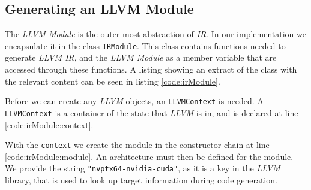 \subsection{Generating an LLVM Module} \label{sec:irmodule}
The \textit{LLVM Module} is the outer most abstraction of \textit{IR}. In our implementation we encapsulate it in the class \texttt{IRModule}. This class contains functions needed to generate \textit{LLVM IR}, and the \textit{LLVM Module} as a member variable that are accessed through these functions. A listing showing an extract of the class with the relevant content can be seen in listing \ref{code:irModule}.

Before we can create any \textit{LLVM} objects, an \texttt{LLVMContext} is needed. A \texttt{LLVMContext} is a container of the state that \textit{LLVM} is in, and is declared at line \ref{code:irModule:context}.

With the \texttt{context} we create the module in the constructor chain at line \ref{code:irModule:module}. An architecture must then be defined for the module. We provide the string \texttt{"nvptx64-nvidia-cuda"}, as it is a key in the \textit{LLVM} library, that is used to look up target information during code generation. 

